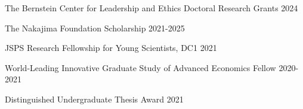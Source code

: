 
\begin{cventries}

\cventrysimple
    {The Bernstein Center for Leadership and Ethics Doctoral Research Grants}  %
    {2024} %
    {}
	
\cventrysimple
    {The Nakajima Foundation Scholarship}  %
    {2021-2025} %
    {}
	
\cventrysimple
	{JSPS Research Fellowship for Young Scientists, DC1}  %
    {2021} %
    {}

\cventrysimple
	{World-Leading Innovative Graduate Study of Advanced Economics Fellow}  %
    {2020-2021} %
    {}

\cventrysimple
    {Distinguished Undergraduate Thesis Award}  %
    {2021} %
    {}


\end{cventries}
